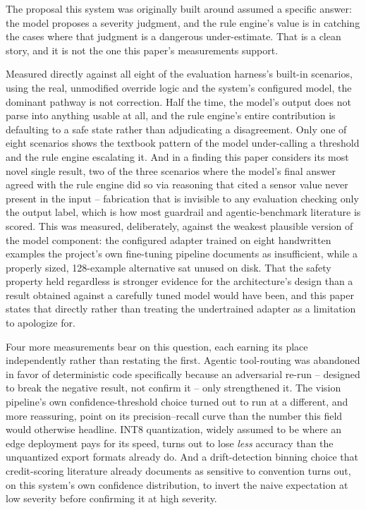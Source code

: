 The proposal this system was originally built around assumed a specific answer: the model proposes
a severity judgment, and the rule engine's value is in catching the cases where that judgment is a
dangerous under-estimate. That is a clean story, and it is not the one this paper's measurements
support.


Measured directly against all eight of the evaluation harness's built-in scenarios, using the real,
unmodified override logic and the system's configured model, the dominant pathway is not correction. Half the
time, the model's output does not parse into anything usable at all, and the rule engine's entire
contribution is defaulting to a safe state rather than adjudicating a disagreement. Only one of
eight scenarios shows the textbook pattern of the model under-calling a threshold and the rule
engine escalating it. And in a finding this paper considers its most novel single result, two of
the three scenarios where the model's final answer agreed with the rule engine did so via reasoning
that cited a sensor value never present in the input -- fabrication that is invisible to any
evaluation checking only the output label, which is how most guardrail and agentic-benchmark
literature is scored. This was measured, deliberately, against the weakest plausible version of the
model component: the configured adapter trained on eight handwritten examples the project's own
fine-tuning pipeline documents as insufficient, while a properly sized, 128-example alternative sat
unused on disk. That the safety property held regardless is stronger evidence for the
architecture's design than a result obtained against a carefully tuned model would have been, and
this paper states that directly rather than treating the undertrained adapter as a limitation to
apologize for.


Four more measurements bear on this question, each earning its place independently rather than
restating the first. Agentic tool-routing was abandoned in favor of deterministic code specifically
because an adversarial re-run -- designed to break the negative result, not confirm it -- only
strengthened it. The vision pipeline's own confidence-threshold choice turned out to run at a
different, and more reassuring, point on its precision--recall curve than the number this field
would otherwise headline. INT8 quantization, widely assumed to be where an edge deployment pays for
its speed, turns out to lose \emph{less} accuracy than the unquantized export formats already do.
And a drift-detection binning choice that credit-scoring literature already documents as sensitive
to convention turns out, on this system's own confidence distribution, to invert the naive
expectation at low severity before confirming it at high severity.

